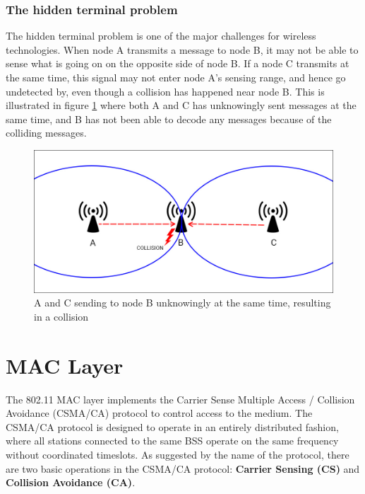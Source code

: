 {     \subsubsection{The hidden terminal problem}
     The hidden terminal problem is one of the major challenges for wireless technologies. 
     When node A transmits a message to node B, it may not be able to sense what is going on
     on the opposite side of node B. If a node C transmits at the same time, this signal may not enter node A's sensing range, and
     hence go undetected by, even though a collision has happened near node B. This is illustrated in figure \ref{fig:hiddenterminal} where
     both A and C has unknowingly sent messages at the same time, and B has not been able to decode any messages because of the colliding messages. 

     \begin{figure}
     \center
     \includegraphics[scale=0.3]{Images/Hiddenterminalfigure.jpg}
     \caption{A and C sending to node B unknowingly at the same time, resulting in a collision}
     \label{fig:hiddenterminal}
     \end{figure}


     \section{MAC Layer}
     The 802.11 MAC layer implements the Carrier Sense Multiple Access / Collision Avoidance (CSMA/CA) protocol to control access to the medium.
     The CSMA/CA protocol is designed to operate in an entirely distributed fashion, where all stations connected to the same BSS  operate on
     the same frequency without coordinated timeslots. As suggested by the name of the protocol, there are two basic operations in the CSMA/CA protocol:
     \textbf{Carrier Sensing (CS)} and \textbf{Collision Avoidance (CA)}. 

}
